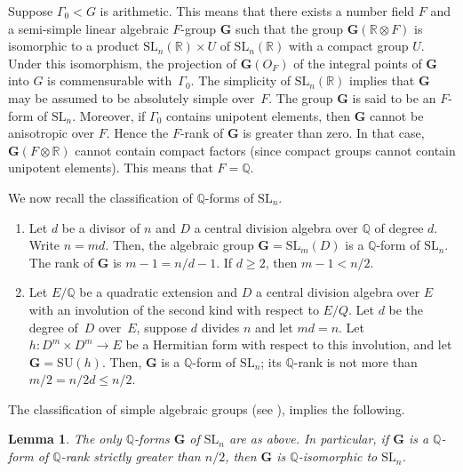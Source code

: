 \documentclass[JEP,XML,SOM,Unicode,published]{cedram}
\newcommand{\bG}{\boldsymbol{G}}
\newtheorem{lemma}{Lemma}
\theoremstyle{definition}
\newcommand{\field}[1]{\mathbb{#1}}
\newcommand{\Q}{\field{Q}}
\newcommand{\R}{\field{R}}
\newcommand{\SL}{\mathrm{SL}}
\begin{document}
Suppose $\Gamma_0 < G$ is arithmetic. This means that there exists a number field $F$ and a semi-simple linear algebraic $F$-group $\bG$ such that the group $\bG(\R\otimes F)$ is isomorphic to a product $\SL_n(\R)\times U$ of $\SL_n(\R)$ with a compact group $U$. Under this isomorphism, the projection of $\bG(O_F)$ of the integral points of $\bG$ into $G$ is commensurable with~$\Gamma_0$. The simplicity of $\SL_n(\R)$ implies that $\bG$ may be assumed to be absolutely simple over~$F$. The group $\bG$ is said to be an $F$-form of $\SL_n$. Moreover, if $\Gamma_0$ contains
unipotent elements, then $\bG$ cannot be anisotropic over $F$. Hence the $F$-rank of $\bG$ is greater than zero. In that case, $\bG(F\otimes \R)$ cannot contain compact factors (since compact groups cannot contain unipotent elements). This means that $F=\Q$.

We now recall the classification of $\Q$-forms of $\SL_n$.

\begin{enumerate}
\item
Let $d$ be a divisor of $n$ and $D$ a central division algebra
over $\Q$ of degree $d$. Write $n=md$. Then, the algebraic group $\bG=\SL_m(D)$ is a $\Q$-form of $\SL_n$. The rank of $\bG$ is
$m-1=n/d-1$. If $d\geq 2$, then $m-1<n/2$.

\item
Let $E/\Q$ be a quadratic extension and $D$ a central division
algebra over $E$ with an involution of the second kind with respect to
$E/Q$. Let $d$ be the degree of~$D$ over~$E$, suppose $d$ divides $n$
and let $md=n$. Let $h:D^m\times D^m\to E$ be a Hermitian form with
respect to this involution, and let $\bG=\mathrm{SU}(h)$. Then, $\bG$
is a $\Q$-form of $\SL_n$; its $\Q$\nobreakdash-rank is not more than $m/2=n/2d\leq
n/2$.
\end{enumerate}

The classification of simple algebraic groups (see \cite{T}), implies
the following.

\begin{lemma} \label{classification} The only $\Q$-forms $\bG$ of
$\SL_n$ are as above. In particular, if $\bG$ is a $\Q$-form of
$\Q$-rank strictly greater than $n/2$, then $\bG$ is
$\Q$-isomorphic to $\SL_n$.
\end{lemma}
\end{document}
